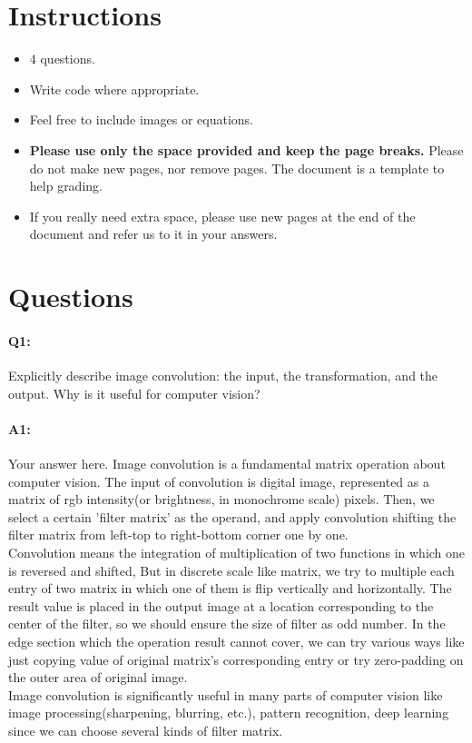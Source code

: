	\maketitle
	\vspace{-3cm}
	\thispagestyle{fancy}
	
	\section*{Instructions}
	\begin{itemize}
		\item 4 questions.
		\item Write code where appropriate.
		\item Feel free to include images or equations.
		\item \textbf{Please use only the space provided and keep the page breaks.} Please do not make new pages, nor remove pages. The document is a template to help grading.
		\item If you really need extra space, please use new pages at the end of the document and refer us to it in your answers.
	\end{itemize}

	\section*{Questions}
	
	\paragraph{Q1:} Explicitly describe image convolution: the input, the transformation, and the output. Why is it useful for computer vision?
	
	\paragraph{A1:} Your answer here.
	Image convolution is a fundamental matrix operation about computer vision. The input of convolution is digital image,
	represented as a matrix of rgb intensity(or brightness, in monochrome scale) pixels. Then, we select a certain 'filter matrix' 
	as the operand, and apply convolution shifting the filter matrix from left-top to right-bottom corner one by one.
	\\Convolution means the integration of multiplication of two functions in which one is reversed and shifted, 	       
	But in discrete scale like matrix, we try to multiple each entry of two matrix in which one of them is flip vertically and horizontally.
	The result value is placed in the output image at a location corresponding to the center of the filter, so we should ensure the size
	of filter as odd number. In the edge section which the operation result cannot cover, we can try various ways like just copying value of 		      
	original matrix's corresponding entry or try zero-padding on the outer area of original image.
	\\Image convolution is significantly useful in many parts of computer vision like image processing(sharpening, blurring, etc.), 
	pattern recognition, deep learning since we can choose several kinds of filter matrix. 
	
